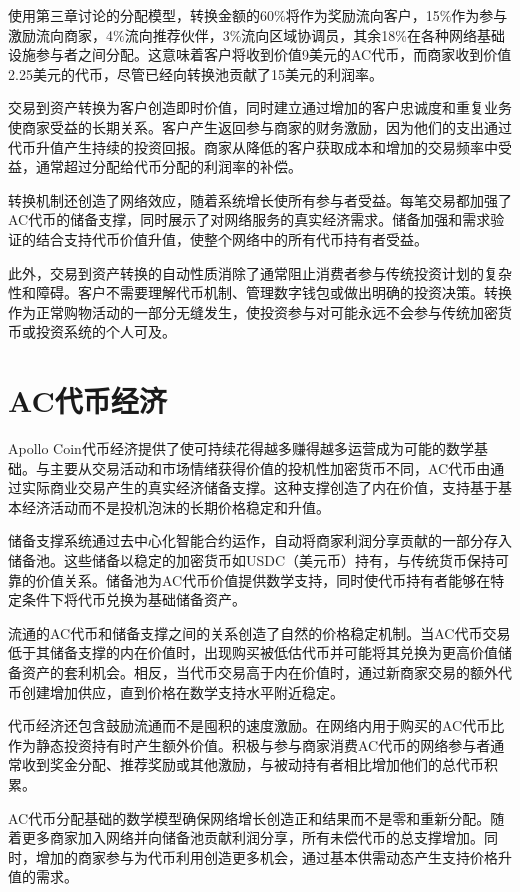 \documentclass[
  Letterpaper,
]{scrbook}
\begin{document}
使用第三章讨论的分配模型，转换金额的60\%将作为奖励流向客户，15\%作为参与激励流向商家，4\%流向推荐伙伴，3\%流向区域协调员，其余18\%在各种网络基础设施参与者之间分配。这意味着客户将收到价值9美元的AC代币，而商家收到价值2.25美元的代币，尽管已经向转换池贡献了15美元的利润率。

交易到资产转换为客户创造即时价值，同时建立通过增加的客户忠诚度和重复业务使商家受益的长期关系。客户产生返回参与商家的财务激励，因为他们的支出通过代币升值产生持续的投资回报。商家从降低的客户获取成本和增加的交易频率中受益，通常超过分配给代币分配的利润率的补偿。

转换机制还创造了网络效应，随着系统增长使所有参与者受益。每笔交易都加强了AC代币的储备支撑，同时展示了对网络服务的真实经济需求。储备加强和需求验证的结合支持代币价值升值，使整个网络中的所有代币持有者受益。

此外，交易到资产转换的自动性质消除了通常阻止消费者参与传统投资计划的复杂性和障碍。客户不需要理解代币机制、管理数字钱包或做出明确的投资决策。转换作为正常购物活动的一部分无缝发生，使投资参与对可能永远不会参与传统加密货币或投资系统的个人可及。

\section{AC代币经济}\label{acux4ee3ux5e01ux7ecfux6d4e}

Apollo
Coin代币经济提供了使可持续花得越多赚得越多运营成为可能的数学基础。与主要从交易活动和市场情绪获得价值的投机性加密货币不同，AC代币由通过实际商业交易产生的真实经济储备支撑。这种支撑创造了内在价值，支持基于基本经济活动而不是投机泡沫的长期价格稳定和升值。

储备支撑系统通过去中心化智能合约运作，自动将商家利润分享贡献的一部分存入储备池。这些储备以稳定的加密货币如USDC（美元币）持有，与传统货币保持可靠的价值关系。储备池为AC代币价值提供数学支持，同时使代币持有者能够在特定条件下将代币兑换为基础储备资产。

流通的AC代币和储备支撑之间的关系创造了自然的价格稳定机制。当AC代币交易低于其储备支撑的内在价值时，出现购买被低估代币并可能将其兑换为更高价值储备资产的套利机会。相反，当代币交易高于内在价值时，通过新商家交易的额外代币创建增加供应，直到价格在数学支持水平附近稳定。

代币经济还包含鼓励流通而不是囤积的速度激励。在网络内用于购买的AC代币比作为静态投资持有时产生额外价值。积极与参与商家消费AC代币的网络参与者通常收到奖金分配、推荐奖励或其他激励，与被动持有者相比增加他们的总代币积累。

AC代币分配基础的数学模型确保网络增长创造正和结果而不是零和重新分配。随着更多商家加入网络并向储备池贡献利润分享，所有未偿代币的总支撑增加。同时，增加的商家参与为代币利用创造更多机会，通过基本供需动态产生支持价格升值的需求。
\end{document}
